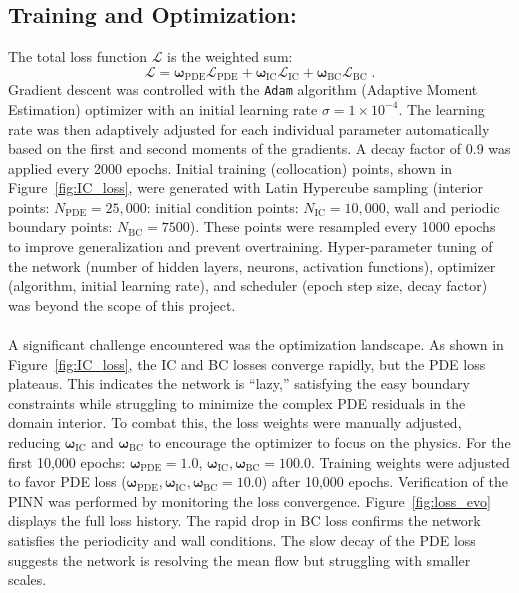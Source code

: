 \documentclass{homework}
\begin{document}
\subsection*{Training and Optimization: \qquad}
The total loss function $\mathcal{L}$ is the weighted sum:
$$ \mathcal{L} = \bm{\omega}_{\mathrm{PDE}} \mathcal{L}_\mathrm{{PDE}} + \bm{\omega}_{\mathrm{IC}} \mathcal{L}_{\mathrm{IC}} + \bm{\bm{\omega}}_{\mathrm{BC}} \mathcal{L}_{\mathrm{BC}} \; .$$
Gradient descent was controlled with the \texttt{Adam} algorithm (Adaptive Moment Estimation) optimizer with an initial learning rate $\sigma = 1 \times 10^{-4}$. The learning rate was then adaptively adjusted for each individual parameter automatically based on the first and second moments of the gradients. A decay factor of 0.9 was applied every 2000 epochs. Initial training (collocation) points, shown in Figure~\ref{fig:IC_loss}, were generated with Latin Hypercube sampling (interior points: $N_\mathrm{PDE} = 25,000$: initial condition points: $N_\mathrm{IC} = 10,000$, wall and periodic boundary points: $N_\mathrm{BC} = 7500$). These points were resampled every 1000 epochs to improve generalization and prevent overtraining. Hyper-parameter tuning of the network (number of hidden layers, neurons, activation functions), optimizer (algorithm, initial learning rate), and scheduler (epoch step size, decay factor) was beyond the scope of this project.
\\ \\
A significant challenge encountered was the optimization landscape. As shown in Figure~\ref{fig:IC_loss}, the IC and BC losses converge rapidly, but the PDE loss plateaus. This indicates the network is ``lazy,'' satisfying the easy boundary constraints while struggling to minimize the complex PDE residuals in the domain interior. To combat this, the loss weights were manually adjusted, reducing $\bm{\omega}_{\mathrm{IC}}$ and $\bm{\omega}_{\mathrm{BC}}$ to encourage the optimizer to focus on the physics. For the first 10,000 epochs: $\bm{\omega}_\mathrm{PDE} = 1.0$, $\bm{\omega}_\mathrm{IC}, \bm{\omega}_\mathrm{BC} = 100.0$. Training weights were adjusted to favor PDE loss ($\bm{\omega}_\mathrm{PDE}, \bm{\omega}_\mathrm{IC}, \bm{\omega}_\mathrm{BC} = 10.0$) after 10,000 epochs. Verification of the PINN was performed by monitoring the loss convergence. Figure~\ref{fig:loss_evo} displays the full loss history. The rapid drop in BC loss confirms the network satisfies the periodicity and wall conditions. The slow decay of the PDE loss suggests the network is resolving the mean flow but struggling with smaller scales.
\end{document}
